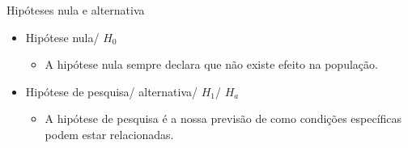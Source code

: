 \documentclass[
  ignorenonframetext,
]{beamer}
\providecommand{\tightlist}{%
  \setlength{\itemsep}{0pt}\setlength{\parskip}{0pt}}
\begin{document}
\begin{frame}{Hipóteses nula e alternativa}
\protect\hypertarget{hipuxf3teses-nula-e-alternativa}{}
\begin{itemize}
\tightlist
\item
  Hipótese nula/ \(H_{0}\)

  \begin{itemize}
  \tightlist
  \item
    A hipótese nula sempre declara que não existe efeito na população.
  \end{itemize}
\item
  Hipótese de pesquisa/ alternativa/ \(H_{1}\)/ \(H_{a}\)

  \begin{itemize}
  \tightlist
  \item
    A hipótese de pesquisa é a nossa previsão de como condições
    específicas podem estar relacionadas.
  \end{itemize}
\end{itemize}
\end{frame}
\end{document}
